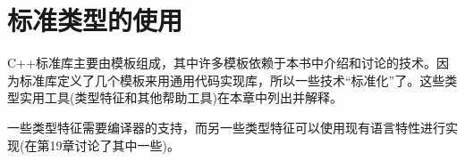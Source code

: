 \chapter{标准类型的使用}
C++标准库主要由模板组成，其中许多模板依赖于本书中介绍和讨论的技术。因为标准库定义了几个模板来用通用代码实现库，所以一些技术“标准化”了。这些类型实用工具(类型特征和其他帮助工具)在本章中列出并解释。

一些类型特征需要编译器的支持，而另一些类型特征可以使用现有语言特性进行实现(在第19章讨论了其中一些)。






